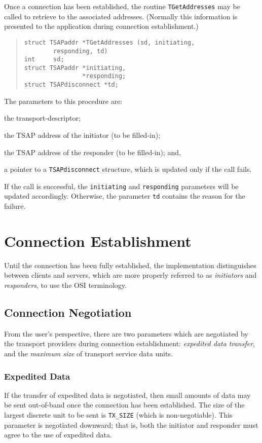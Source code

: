 Once a connection has been established,
the routine \verb"TGetAddresses" may be called to retrieve to the associated
addresses.
(Normally this information is presented to the application during connection
establishment.)
\begin{quote}\small\begin{verbatim}
struct TSAPaddr *TGetAddresses (sd, initiating,
        responding, td)
int     sd;
struct TSAPaddr *initiating,
                *responding;
struct TSAPdisconnect *td;
\end{verbatim}\end{quote}
The parameters to this procedure are:
\begin{describe}
\item[\verb"sd":] the transport-descriptor;

\item[\verb"initiating":] the TSAP address of the initiator (to be filled-in);

\item[\verb"responding":] the TSAP address of the responder (to be filled-in);
and,

\item[\verb"td":] a pointer to a \verb"TSAPdisconnect" structure, which is
updated only if the call fails.
\end{describe}
If the call is successful,
the \verb"initiating" and \verb"responding" parameters will be updated
accordingly.
Otherwise,
the parameter \verb"td" contains the reason for the failure.

\section	{Connection Establishment}
Until the connection has been fully established,
the implementation distinguishes between clients and servers,
which are more properly referred to as {\em initiators\/} and
{\em responders}, to use the OSI terminology.

\subsection	{Connection Negotiation}
From the user's perspective,
there are two parameters which are negotiated by the transport providers
during connection establishment:
{\em expedited data transfer},
and the {\em maximum size\/} of transport service data units.

\subsubsection	{Expedited Data}
If the transfer of expedited data is negotiated,
then small amounts of data may be sent out-of-band once the connection has
been established.
The size of the largest discrete unit to be sent is \verb"TX_SIZE"
(which is non-negotiable).
This parameter is negotiated downward;
that is, both the initiator and responder must agree to the use of expedited
data.

